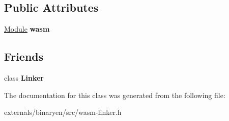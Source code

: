 \subsection*{Public Attributes}
\begin{DoxyCompactItemize}
\item 
\mbox{\label{classwasm_1_1_linker_object_aa94073833dd6c4e73a8adfac0135d188}} 
\mbox{\hyperlink{classwasm_1_1_module}{Module}} {\bfseries wasm}
\end{DoxyCompactItemize}
\subsection*{Friends}
\begin{DoxyCompactItemize}
\item 
\mbox{\label{classwasm_1_1_linker_object_a4d44fee533e9a0a3f5211edf3031ec06}} 
class {\bfseries Linker}
\end{DoxyCompactItemize}


The documentation for this class was generated from the following file\+:\begin{DoxyCompactItemize}
\item 
externals/binaryen/src/wasm-\/linker.\+h\end{DoxyCompactItemize}
